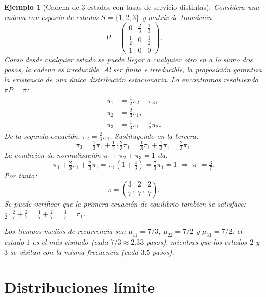 \documentclass[12pt]{book}
\newtheorem{example}{Ejemplo}[chapter]
\begin{document}
\begin{example}[Cadena de 3 estados con tasas de servicio distintas]
    Considera una cadena con espacio de estados $S = \{1, 2, 3\}$ y matriz de transición
    \[
        P = \begin{pmatrix}
            0 & \tfrac{2}{3} & \tfrac{1}{3} \\[4pt]
            \tfrac{1}{2} & 0 & \tfrac{1}{2} \\[4pt]
            1 & 0 & 0
        \end{pmatrix}.
    \]
    Como desde cualquier estado se puede llegar a cualquier otro en a lo sumo dos pasos, la cadena es irreducible. Al ser finita e irreducible, la proposición garantiza la existencia de una única distribución estacionaria. La encontramos resolviendo $\pi P = \pi$:
    \begin{align*}
        \pi_1 &= \tfrac{1}{2}\pi_2 + \pi_3, \\
        \pi_2 &= \tfrac{2}{3}\pi_1, \\
        \pi_3 &= \tfrac{1}{3}\pi_1 + \tfrac{1}{2}\pi_2.
    \end{align*}
    De la segunda ecuación, $\pi_2 = \tfrac{2}{3}\pi_1$. Sustituyendo en la tercera:
    \[
        \pi_3 = \tfrac{1}{3}\pi_1 + \tfrac{1}{2}\cdot\tfrac{2}{3}\pi_1 = \tfrac{1}{3}\pi_1 + \tfrac{1}{3}\pi_1 = \tfrac{2}{3}\pi_1.
    \]
    La condición de normalización $\pi_1 + \pi_2 + \pi_3 = 1$ da:
    \[
        \pi_1 + \tfrac{2}{3}\pi_1 + \tfrac{2}{3}\pi_1 = \pi_1\!\left(1 + \tfrac{4}{3}\right) = \tfrac{7}{3}\pi_1 = 1 \;\Longrightarrow\; \pi_1 = \tfrac{3}{7}.
    \]
    Por tanto:
    \[
        \pi = \left(\frac{3}{7},\; \frac{2}{7},\; \frac{2}{7}\right).
    \]
    Se puede verificar que la primera ecuación de equilibrio también se satisface: $\tfrac{1}{2}\cdot\tfrac{2}{7} + \tfrac{2}{7} = \tfrac{1}{7}+\tfrac{2}{7} = \tfrac{3}{7} = \pi_1$. \checkmark

    Los tiempos medios de recurrencia son $\mu_{11} = 7/3$, $\mu_{22} = 7/2$ y $\mu_{33} = 7/2$: el estado $1$ es el más visitado (cada $7/3 \approx 2.33$ pasos), mientras que los estados $2$ y $3$ se visitan con la misma frecuencia (cada $3.5$ pasos).
\end{example}

\section{Distribuciones límite}
\end{document}
